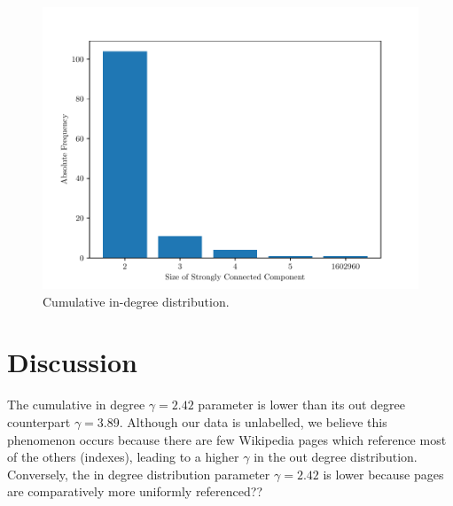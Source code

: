 \documentclass[9pt,a4paper,twocolumn]{article}
\begin{document}
\begin{figure}[H]
	\centering
	\includegraphics[width=\linewidth]{wikipedia_pt_sccdistr.pdf}
	\caption{Cumulative in-degree distribution.}
	\label{fig:sccdist}
\end{figure}



\section{Discussion}

The cumulative in degree $\gamma = 2.42$ parameter is lower than its out degree counterpart $\gamma = 3.89$. Although our data is unlabelled, we believe this phenomenon occurs because there are few Wikipedia pages which reference most of the others (indexes), leading to a higher $\gamma$ in the out degree distribution. Conversely, the in degree distribution parameter $\gamma = 2.42$ is lower because pages are comparatively more uniformly referenced??



\end{document}

